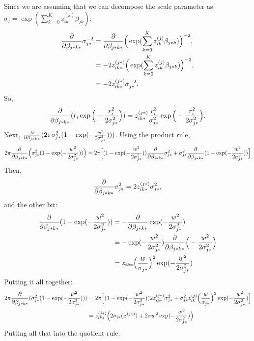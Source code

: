 Since we are assuming that we can decompose the scale parameter as $\sigma_j = \exp ( \sum_{k=0}^{K} z^{(j)}_{ik} \beta_{jk})$, 
\begin{align*}
\frac{\partial}{\partial \beta_{j*k*}} \sigma_{j*}^{-2} &= \frac{\partial}{\partial \beta_{j*k*}} \Big(\exp ( \sum_{k=0}^{K} z_{ik}^{(j)} \beta_{j*k})\Big)^{-2},\\
&= -2 z_{ik*}^{(j*)} \Big(\exp ( \sum_{k=0}^{K} z_{ik}^{(j)} \beta_{j*k})\Big)^{-2},\\
&= -2 z_{ik*}^{(j*)} \sigma_{j*}^{-2}.\\
\end{align*}
So,
\begin{equation*}
\frac{\partial}{\partial \beta_{j*k*}} (r_i \exp\Big( -\frac{r_i^2}{2\sigma_{j*}^2} \Big)) = z_{ik*}^{(j*)} \frac{r_i^3}{\sigma_{j*}^2} \exp\Big( -\frac{r_i^2}{2\sigma_{j*}^2} \Big).
\end{equation*}
Next, $\frac{\partial}{\partial \beta_{j*k*}} (2 \pi \sigma_{j*}^2(1-\exp( -\frac{w^2}{2\sigma_{j*}^2})))$. Using the product rule,
\begin{equation*}
2 \pi \frac{\partial}{\partial \beta_{j*k*}} \Big( \sigma_{j*}^2(1-\exp( -\frac{w^2}{2\sigma_{j*}^2})) \Big) = 2\pi \Big[(1-\exp( -\frac{w^2}{2\sigma_{j*}^2}))\frac{\partial}{\partial \beta_{j*k*}} \sigma_{j*}^2 +  \sigma_{j*}^2 \frac{\partial}{\partial \beta_{j*k*}} (1-\exp( -\frac{w^2}{2\sigma_{j*}^2}))\Big]
\end{equation*}
Then,
\begin{equation*}
\frac{\partial}{\partial \beta_{j*k*}} \sigma_{j*}^2=2 z_{ik*}^{(j*)} \sigma_{j*}^2,
\end{equation*}
and the other bit:
\begin{align*}
\frac{\partial}{\partial \beta_{j*k*}} (1-\exp( -\frac{w^2}{2\sigma_{j*}^2}))&= - \frac{\partial}{\partial \beta_{j*k*}} \exp( -\frac{w^2}{2\sigma_{j*}^2})\\
&= - \exp( -\frac{w^2}{2\sigma_{j*}^2}) \frac{\partial}{\partial \beta_{j*k*}} \Big( -\frac{w^2}{2\sigma_{j*}^2}\Big)\\
&= z_{ik*} \Big(\frac{w}{\sigma_{j*}}\Big)^2 \exp( -\frac{w^2}{2\sigma_{j*}^2})
\end{align*}
Putting it all together:
\begin{align*}
2\pi \frac{\partial}{\partial \beta_{j*k*}} (\sigma_{j*}^2(1-\exp( -\frac{w^2}{2\sigma_{j*}^2})))&= 2\pi \Big[(1-\exp( -\frac{w^2}{2\sigma_{j*}^2})) 2 z_{ik*}^{(j*)} \sigma_{j*}^2 +  \sigma_{j*}^2 z_{ik}^{(j)} \Big(\frac{w}{\sigma_{j*}}\Big)^2 \exp( -\frac{w^2}{2\sigma_{j*}^2})\Big]\\
&=z_{ik*}^{(j*)} \Big( 2  \nu_{j*}(\bm{z}^{(j*)}) +  2\pi w^2 \exp( -\frac{w^2}{2\sigma_{j*}^2})\Big)\\
\end{align*}
Putting all that into the quotient rule:
